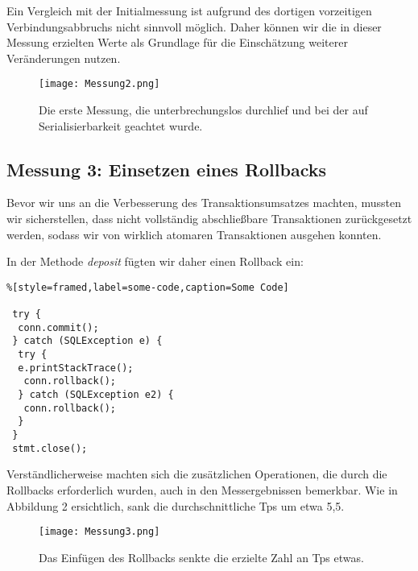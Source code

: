 \documentclass[a4paper, bibliography=totoc, 12pt]{scrartcl}
\begin{document}
	\noindent
	Ein Vergleich mit der Initialmessung ist aufgrund des dortigen vorzeitigen Verbindungsabbruchs nicht sinnvoll möglich. Daher können wir die in dieser Messung erzielten Werte als Grundlage für die Einschätzung weiterer Veränderungen nutzen.
	\begin{figure}[h]
	\texttt{[image: Messung2.png]}
	\caption{Die erste Messung, die unterbrechungslos durchlief und bei der auf Serialisierbarkeit geachtet wurde.}
	\end{figure}
	
	\subsection{Messung 3: Einsetzen eines Rollbacks}

Bevor wir uns an die Verbesserung des Transaktionsumsatzes machten, mussten wir sicherstellen, dass nicht vollständig abschließbare Transaktionen zurückgesetzt werden, sodass wir von wirklich atomaren Transaktionen ausgehen konnten.

In der Methode \emph{deposit} fügten wir daher einen Rollback ein:
	\begin{lstlisting}%[style=framed,label=some-code,caption=Some Code]

 try {
  conn.commit();
 } catch (SQLException e) {
  try {
  e.printStackTrace();
   conn.rollback();
  } catch (SQLException e2) {
   conn.rollback();
  }
 }
 stmt.close();
	\end{lstlisting}
	
	Verständlicherweise machten sich die zusätzlichen Operationen, die durch die Rollbacks erforderlich wurden, auch in den Messergebnissen bemerkbar. Wie in Abbildung 2 ersichtlich, sank die durchschnittliche Tps um etwa 5,5.

	\begin{figure}[h]
	\texttt{[image: Messung3.png]}
	\caption{Das Einfügen des Rollbacks senkte die erzielte Zahl an Tps etwas.}
	\end{figure}	
	
\end{document}
